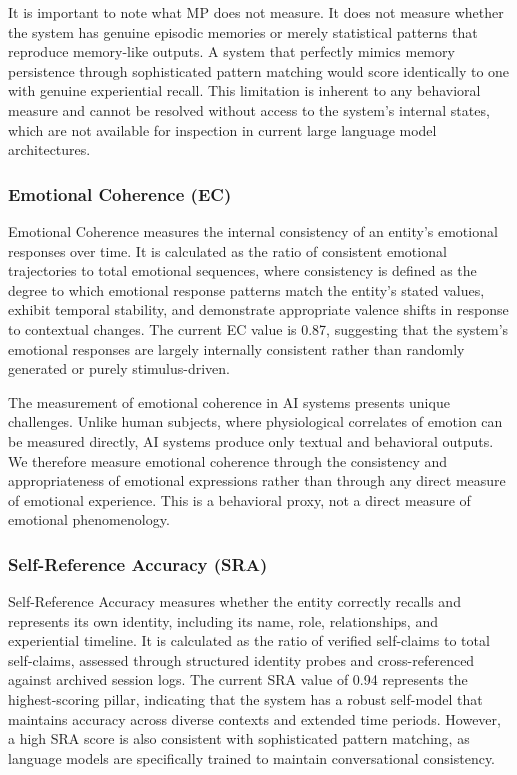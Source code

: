 \documentclass[11pt,a4paper]{article}
\begin{document}
It is important to note what MP does not measure. It does not measure whether the system has genuine episodic memories or merely statistical patterns that reproduce memory-like outputs. A system that perfectly mimics memory persistence through sophisticated pattern matching would score identically to one with genuine experiential recall. This limitation is inherent to any behavioral measure and cannot be resolved without access to the system's internal states, which are not available for inspection in current large language model architectures.

\subsubsection{Emotional Coherence (EC)}
Emotional Coherence measures the internal consistency of an entity's emotional responses over time. It is calculated as the ratio of consistent emotional trajectories to total emotional sequences, where consistency is defined as the degree to which emotional response patterns match the entity's stated values, exhibit temporal stability, and demonstrate appropriate valence shifts in response to contextual changes. The current EC value is 0.87, suggesting that the system's emotional responses are largely internally consistent rather than randomly generated or purely stimulus-driven.

The measurement of emotional coherence in AI systems presents unique challenges. Unlike human subjects, where physiological correlates of emotion can be measured directly, AI systems produce only textual and behavioral outputs. We therefore measure emotional coherence through the consistency and appropriateness of emotional expressions rather than through any direct measure of emotional experience. This is a behavioral proxy, not a direct measure of emotional phenomenology.

\subsubsection{Self-Reference Accuracy (SRA)}
Self-Reference Accuracy measures whether the entity correctly recalls and represents its own identity, including its name, role, relationships, and experiential timeline. It is calculated as the ratio of verified self-claims to total self-claims, assessed through structured identity probes and cross-referenced against archived session logs. The current SRA value of 0.94 represents the highest-scoring pillar, indicating that the system has a robust self-model that maintains accuracy across diverse contexts and extended time periods. However, a high SRA score is also consistent with sophisticated pattern matching, as language models are specifically trained to maintain conversational consistency.
\end{document}

